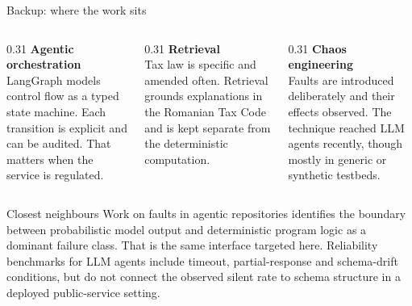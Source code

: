 \documentclass[aspectratio=169,10pt]{beamer}
\newcommand{\cmt}[1]{{\color{stone}\small #1}}          %
\begin{document}
\begin{frame}[noframenumbering]{Backup: where the work sits}
  \begin{columns}[T]
    \begin{column}{0.31\textwidth}
      \textbf{Agentic orchestration}\\[0.3em]
      \cmt{LangGraph models control flow as a typed state machine. Each transition is
      explicit and can be audited. That matters when the service is regulated.}
    \end{column}
    \begin{column}{0.31\textwidth}
      \textbf{Retrieval}\\[0.3em]
      \cmt{Tax law is specific and amended often. Retrieval grounds explanations in the
      Romanian Tax Code and is kept separate from the deterministic computation.}
    \end{column}
    \begin{column}{0.31\textwidth}
      \textbf{Chaos engineering}\\[0.3em]
      \cmt{Faults are introduced deliberately and their effects observed. The technique reached
      LLM agents recently, though mostly in generic or synthetic testbeds.}
    \end{column}
  \end{columns}
  \vfill
  \begin{block}{Closest neighbours}
    \small Work on faults in agentic repositories identifies the boundary between probabilistic
    model output and deterministic program logic as a dominant failure class. That is the same
    interface targeted here. Reliability benchmarks for LLM agents include timeout,
    partial-response and schema-drift conditions, but do not connect the observed silent rate
    to schema structure in a deployed public-service setting.
  \end{block}
\end{frame}
\end{document}
